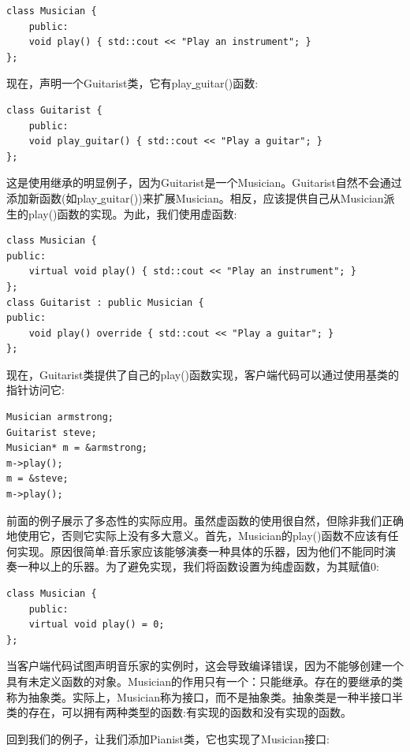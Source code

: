 \begin{lstlisting}[caption={}]
class Musician {
	public:
	void play() { std::cout << "Play an instrument"; }
};
\end{lstlisting}

现在，声明一个Guitarist类，它有play\underline{ }guitar()函数: \par

\begin{lstlisting}[caption={}]
class Guitarist {
	public:
	void play_guitar() { std::cout << "Play a guitar"; }
};
\end{lstlisting}

这是使用继承的明显例子，因为Guitarist是一个Musician。Guitarist自然不会通过添加新函数(如play\underline{ }guitar())来扩展Musician。相反，应该提供自己从Musician派生的play()函数的实现。为此，我们使用虚函数: \par

\begin{lstlisting}[caption={}]
class Musician {
public:
	virtual void play() { std::cout << "Play an instrument"; }
};
class Guitarist : public Musician {
public:
	void play() override { std::cout << "Play a guitar"; }
};
\end{lstlisting}

现在，Guitarist类提供了自己的play()函数实现，客户端代码可以通过使用基类的指针访问它: \par

\begin{lstlisting}[caption={}]
Musician armstrong;
Guitarist steve;
Musician* m = &armstrong;
m->play();
m = &steve;
m->play();
\end{lstlisting}

前面的例子展示了多态性的实际应用。虽然虚函数的使用很自然，但除非我们正确地使用它，否则它实际上没有多大意义。首先，Musician的play()函数不应该有任何实现。原因很简单:音乐家应该能够演奏一种具体的乐器，因为他们不能同时演奏一种以上的乐器。为了避免实现，我们将函数设置为纯虚函数，为其赋值0: \par

\begin{lstlisting}[caption={}]
class Musician {
	public:
	virtual void play() = 0;
};
\end{lstlisting}

当客户端代码试图声明音乐家的实例时，这会导致编译错误，因为不能够创建一个具有未定义函数的对象。Musician的作用只有一个：只能继承。存在的要继承的类称为抽象类。实际上，Musician称为接口，而不是抽象类。抽象类是一种半接口半类的存在，可以拥有两种类型的函数:有实现的函数和没有实现的函数。\par
回到我们的例子，让我们添加Pianist类，它也实现了Musician接口:\par


